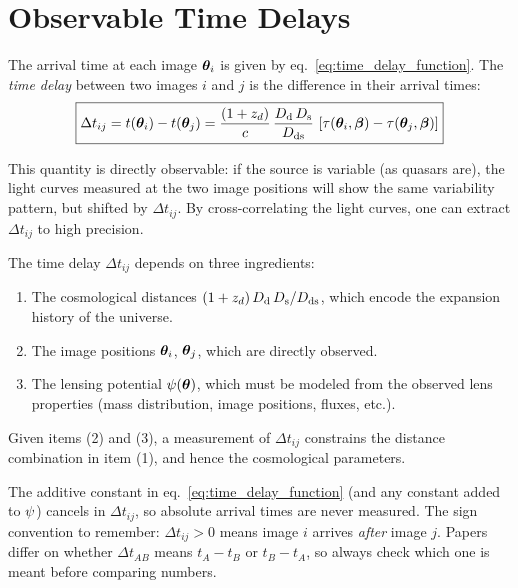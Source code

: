\section{Observable Time Delays}
\label{sec:observable_time_delays}

The arrival time at each image $\boldsymbol{\theta}_i$ is given by
eq.~\eqref{eq:time_delay_function}.  The \emph{time delay} between
two images $i$ and $j$ is the difference in their arrival times:
\begin{equation}
    \boxed{
    \Delta t_{ij} = t(\boldsymbol{\theta}_i) - t(\boldsymbol{\theta}_j)
    = \frac{(1 + z_d)}{c}\,
    \frac{D_{\mathrm{d}}\,D_{\mathrm{s}}}{D_{\mathrm{ds}}}\,
    \left[\tau(\boldsymbol{\theta}_i, \boldsymbol{\beta}) - \tau(\boldsymbol{\theta}_j, \boldsymbol{\beta})\right]
    }
    \label{eq:time_delay_between_images}
\end{equation}

This quantity is directly observable: if the source is variable
(as quasars are), the light curves measured at the two image positions
will show the same variability pattern, but shifted by $\Delta t_{ij}$.
By cross-correlating the light curves, one can extract $\Delta t_{ij}$
to high precision.

\begin{remark}
The time delay $\Delta t_{ij}$ depends on three ingredients:
\begin{enumerate}[nosep]
    \item The cosmological distances $(1+z_d)\,D_{\mathrm{d}}\,D_{\mathrm{s}}/D_{\mathrm{ds}}$,
          which encode the expansion history of the universe.
    \item The image positions $\boldsymbol{\theta}_i$, $\boldsymbol{\theta}_j$,
          which are directly observed.
    \item The lensing potential $\psi(\boldsymbol{\theta})$, which must
          be modeled from the observed lens properties (mass distribution,
          image positions, fluxes, etc.).
\end{enumerate}
Given items (2) and (3), a measurement of $\Delta t_{ij}$ constrains
the distance combination in item (1), and hence the cosmological
parameters.
\end{remark}

\begin{annotation}
The additive constant in eq.~\eqref{eq:time_delay_function} (and any constant
added to $\psi$) cancels in $\Delta t_{ij}$, so absolute arrival times are
never measured.  The sign convention to remember: $\Delta t_{ij}>0$ means
image $i$ arrives \emph{after} image $j$.  Papers differ on whether
$\Delta t_{AB}$ means $t_A-t_B$ or $t_B-t_A$, so always check which one is meant
before comparing numbers.
\end{annotation}


